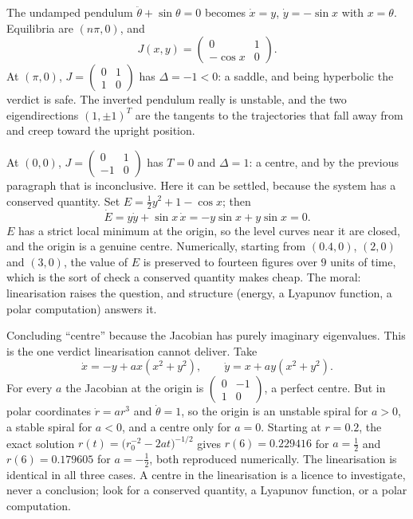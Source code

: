 \begin{worked}
The undamped pendulum $\ddot\theta+\sin\theta=0$ becomes $\dot x=y$, $\dot y=-\sin x$ with $x=\theta$. Equilibria are $(n\pi,0)$, and
\[J(x,y)=\begin{pmatrix}0&1\\-\cos x&0\end{pmatrix}.\]
At $(\pi,0)$, $J=\begin{pmatrix}0&1\\1&0\end{pmatrix}$ has $\Delta=-1<0$: a saddle, and being hyperbolic the verdict is safe. The inverted pendulum really is unstable, and the two eigendirections $(1,\pm1)^{T}$ are the tangents to the trajectories that fall away from and creep toward the upright position.

At $(0,0)$, $J=\begin{pmatrix}0&1\\-1&0\end{pmatrix}$ has $T=0$ and $\Delta=1$: a centre, and by the previous paragraph that is inconclusive. Here it can be settled, because the system has a conserved quantity. Set $E=\tfrac12y^{2}+1-\cos x$; then
\[\dot E=y\dot y+\sin x\,\dot x=-y\sin x+y\sin x=0.\]
$E$ has a strict local minimum at the origin, so the level curves near it are closed, and the origin is a genuine centre. Numerically, starting from $(0.4,0)$, $(2,0)$ and $(3,0)$, the value of $E$ is preserved to fourteen figures over $9$ units of time, which is the sort of check a conserved quantity makes cheap. The moral: linearisation raises the question, and structure (energy, a Lyapunov function, a polar computation) answers it.
\end{worked}

\begin{trap}
Concluding ``centre'' because the Jacobian has purely imaginary eigenvalues. This is the one verdict linearisation cannot deliver. Take
\[\dot x=-y+ax(x^{2}+y^{2}),\qquad \dot y=x+ay(x^{2}+y^{2}).\]
For every $a$ the Jacobian at the origin is $\begin{pmatrix}0&-1\\1&0\end{pmatrix}$, a perfect centre. But in polar coordinates $\dot r=ar^{3}$ and $\dot\theta=1$, so the origin is an unstable spiral for $a>0$, a stable spiral for $a<0$, and a centre only for $a=0$. Starting at $r=0.2$, the exact solution $r(t)=\bigl(r_0^{-2}-2at\bigr)^{-1/2}$ gives $r(6)=0.229416$ for $a=\tfrac12$ and $r(6)=0.179605$ for $a=-\tfrac12$, both reproduced numerically. The linearisation is identical in all three cases. A centre in the linearisation is a licence to investigate, never a conclusion; look for a conserved quantity, a Lyapunov function, or a polar computation.
\end{trap}

